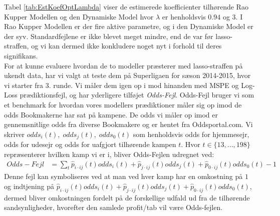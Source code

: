 \documentclass[11pt,a4paper]{article}
\begin{document}
\newpage
Tabel \ref{tab:EstKoefOptLambda} viser de estimerede koefficienter tilhørende Rao Kupper Modellen og den Dynamiske Model hvor $\lambda$ er henholdsvis $0.94$ og $3$. I Rao Kupper Modellen er der fire aktive parametre, og i den Dynamiske Model er der syv. Standardfejlene er ikke blevet meget mindre, end de var før lasso-straffen, og vi kan dermed ikke konkludere noget nyt i forhold til deres signifikans.\\
\newpage
For at kunne evaluere hvordan de to modeller præsterer med lasso-straffen på ukendt data, har vi valgt at teste dem på Superligaen for sæson 2014-2015, hvor vi starter fra 3. runde. Vi måler dem igen op i mod hinanden med MSPE og Log-Loss prædiktionsfejl, og har yderligere tilføjet \textit{Odds-Fejl}. Odds-Fejl bruger vi som et benchmark for hvordan vores modellers prædiktioner måler sig op imod de odds Bookmakerne har sat på kampene. De odds vi måler op imod er gennemsnitlige odds fra diverse Bookmakere og er hentet fra Oddsportal.com. Vi skriver $odds_i(t),\; odds_j(t), \; odds_0(t)$ som henholdsvis odds for hjemmesejr, odds for udesejr og odds for uafgjort tilhørende kampen $t$. Hvor $t \in \{13,...,198 \}$ repræsenterer hvilken kamp vi er i, bliver Odds-Fejlen udregnet ved:\\
\begin{align*}
    Odds-Fejl &= \sum_t \hat{p}_{i\cdot ij}(t)odds_i(t)+\hat{p}_{j\cdot ij}(t)odds_j(t)+\hat{p}_{0\cdot ij}(t)odds_0(t) -1
\end{align*}
Denne fejl kan symboliseres ved at man ved hver kamp har en omkostning på $1$ og indtjening på $\hat{p}_{i\cdot ij}(t)odds_i(t)+\hat{p}_{j\cdot ij}(t)odds_j(t)+\hat{p}_{0\cdot ij}(t)odds_0(t)$, dermed bliver omkostningen fordelt på de forskellige udfald ud fra de tilhørende sandsynligheder, hvorefter den samlede profit/tab vil være Odds-fejlen. 
\end{document}

